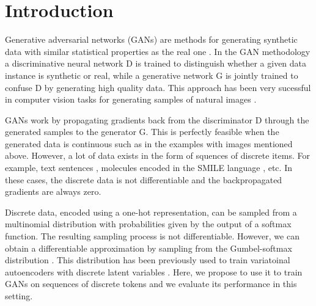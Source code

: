 \section{Introduction}

Generative adversarial networks (GANs) are methods for generating synthetic
data with similar statistical properties as the real one
\cite{goodfellow2014generative}. In the GAN methodology a discriminative neural network D is
trained to distinguish whether a given data instance is synthetic or real,
while a generative network G is jointly trained to confuse D by generating high
quality data. This approach has been very sucessful in computer vision tasks for
generating samples of natural images
\cite{denton2015deep,dosovitskiy2016generating,radford2016}.

GANs work by propagating gradients back from the discriminator D through the
generated samples to the generator G. This is perfectly feasible when the
generated data is continuous such as in the examples with images mentioned
above. However, a lot of data exists in the form of squences of discrete items.
For example, text sentences \cite{Bowman2016}, molecules encoded in the SMILE language \cite{gomez2016automatic}, etc. In these
cases, the discrete data is not differentiable and the backpropagated gradients
are always zero. 

Discrete data, encoded using a one-hot representation, can be sampled from a
multinomial distribution with probabilities given by the output of a softmax
function. The resulting sampling process is not differentiable.  However, we can obtain
a differentiable approximation by sampling from the Gumbel-softmax distribution
\cite{jang2016categorical}. This distribution has been previously used to train
variatoinal autoencoders with discrete latent variables \cite{jang2016categorical}. Here, we propose to
use it to train GANs on sequences of discrete tokens and we evaluate its
performance in this setting.

